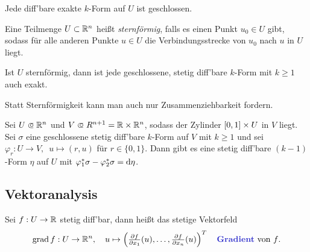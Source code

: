 \documentclass{cheat-sheet}
\DeclareMathOperator{\grad}{grad} %
\theoremstyle{definition}
\begin{document}
\begin{beob}
  Jede diff'bare exakte $k$-Form auf $U$ ist geschlossen.
\end{beob}


\begin{defn}
  Eine Teilmenge $U \subset \mathbb{R}^n$ heißt \emph{sternförmig}, falls es einen Punkt $u_0 \in U$ gibt, sodass für alle anderen Punkte $u \in U$ die Verbindungsstrecke von $u_0$ nach $u$ in $U$ liegt.
\end{defn}

\begin{lem}
  Ist $U$ sternförmig, dann ist jede geschlossene, stetig diff'bare $k$-Form mit $k \geq 1$ auch exakt.
\end{lem}

\begin{bem}
  Statt Sternförmigkeit kann man auch nur Zusammenziehbarkeit fordern.
\end{bem}


\begin{samepage}

\begin{lem}
  Sei $U \opn \R^n$ und $V \opn R^{n{+}1} = \R \times \R^n$, sodass der Zylinder $\left[ 0, 1 \right] \times U$ in $V$ liegt. Sei $\sigma$ eine geschlossene stetig diff'bare $k$-Form auf $V$ mit $k \geq 1$ und sei $\varphi_r : U \to V, \enspace u \mapsto (r, u)$ für $r \in \{ 0, 1 \}$.
  Dann gibt es eine stetig diff'bare $(k{-}1)$-Form $\eta$ auf $U$ mit $\varphi_1^* \sigma - \varphi_2^* \sigma = \mathrm{d} \eta$.
\end{lem}


\subsection{Vektoranalysis}

\end{samepage}


\begin{defn}
  Sei $f : U \to \mathbb{R}$ stetig diff'bar, dann heißt das stetige Vektorfeld
  \[
    \grad f : U \to \R^n, \quad
    u \mapsto \left( \tfrac{\partial f}{\partial x_1} (u), \ldots, \tfrac{\partial f}{\partial x_n} (u) \right)^T
    \quad \text{\emph{Gradient} von $f$.}
  \]
\end{defn}
\end{document}
